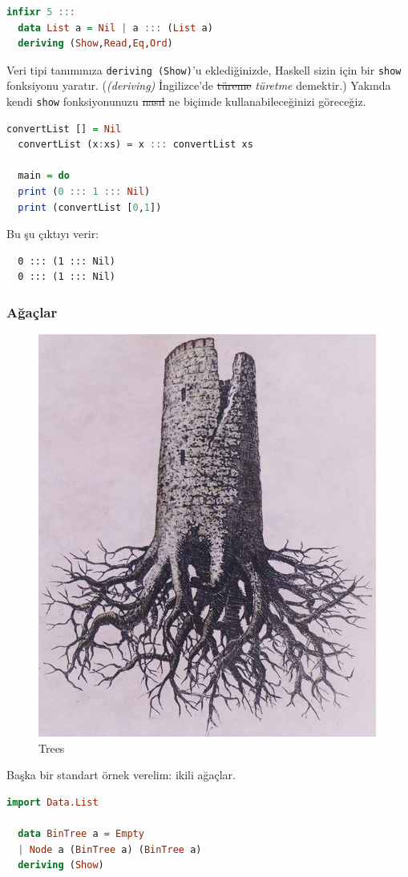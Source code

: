 \documentclass[a4paper,14pt,openany]{extbook} %
\let\emph\textit
\begin{document}
\begin{lstlisting}[language=Haskell]
  infixr 5 :::
  data List a = Nil | a ::: (List a)
  deriving (Show,Read,Eq,Ord)
\end{lstlisting}

Veri tipi tanımınıza \lstinline!deriving (Show)!'u eklediğinizde,
Haskell sizin için bir \lstinline!show! fonksiyonu yaratır.
(\emph{(deriving)} İngilizce'de \st{türeme} \emph{türetme} demektir.) Yakında kendi
\lstinline!show! fonksiyonunuzu \st{nasıl} ne biçimde kullanabileceğinizi göreceğiz.

\begin{lstlisting}[language=Haskell]
  convertList [] = Nil
  convertList (x:xs) = x ::: convertList xs

  main = do
  print (0 ::: 1 ::: Nil)
  print (convertList [0,1])
\end{lstlisting}

Bu şu çıktıyı verir:

\begin{lstlisting}
  0 ::: (1 ::: Nil)
  0 ::: (1 ::: Nil)
\end{lstlisting}

\subsubsection{Ağaçlar}\label{aux11fauxe7lar}

\begin{figure}[htbp]
  \centering
  \includegraphics[width=0.5\linewidth]{img/magritte-l-arbre.jpg}
  \caption{Trees}
\end{figure}

Başka bir standart örnek verelim: ikili ağaçlar.

\begin{lstlisting}[language=Haskell]
  import Data.List

  data BinTree a = Empty
  | Node a (BinTree a) (BinTree a)
  deriving (Show)
\end{lstlisting}
\end{document}
